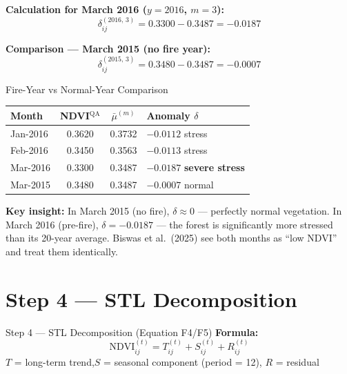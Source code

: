 \documentclass[12pt, a4paper]{article}
\begin{document}
\textbf{Calculation for March 2016 ($y=2016$, $m=3$):}
\begin{equation}
  \delta_{ij}^{(2016,\,3)} =
  0.3300 - 0.3487 = \mathbf{-0.0187}
  \label{eq:anom_mar16}
\end{equation}

\textbf{Comparison --- March 2015 (no fire year):}
\begin{equation}
  \delta_{ij}^{(2015,\,3)} =
  0.3480 - 0.3487 = \mathbf{-0.0007}
  \label{eq:anom_mar15}
\end{equation}

\begin{interpretbox}{Fire-Year vs Normal-Year Comparison}
\begin{center}
\begin{tabular}{lccl}
\toprule
\textbf{Month} & \textbf{NDVI$^{\mathrm{QA}}$} &
\textbf{$\bar{\mu}^{(m)}$} & \textbf{Anomaly $\delta$} \\
\midrule
Jan-2016 & 0.3620 & 0.3732 & $-0.0112$ \quad stress \\
Feb-2016 & 0.3450 & 0.3563 & $-0.0113$ \quad stress \\
Mar-2016 & 0.3300 & 0.3487 & $-0.0187$ \quad \textbf{severe stress} \\
Mar-2015 & 0.3480 & 0.3487 & $-0.0007$ \quad normal \\
\bottomrule
\end{tabular}
\end{center}

\medskip
\textbf{Key insight:} In March 2015 (no fire), $\delta \approx 0$ ---
perfectly normal vegetation. In March 2016 (pre-fire),
$\delta = -0.0187$ --- the forest is significantly more stressed than
its 20-year average. Biswas et al.\ (2025) see both months as
``low NDVI'' and treat them identically.
\end{interpretbox}

\section{Step 4 --- STL Decomposition}
\label{sec:step4}

\begin{stepbox}{Step 4 --- STL Decomposition (Equation F4/F5)}
\textbf{Formula:}
\begin{equation}
  \mathrm{NDVI}_{ij}^{(t)} =
  T_{ij}^{(t)} + S_{ij}^{(t)} + R_{ij}^{(t)}
  \tag{F4/F5}
\end{equation}
$T$ = long-term trend,\quad $S$ = seasonal component (period = 12),
\quad $R$ = residual
\end{stepbox}
\end{document}
